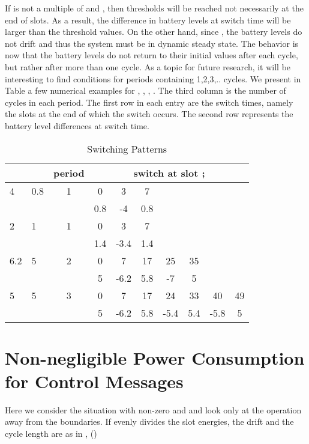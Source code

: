 \documentclass[12 pt]{article}
\newcommand{\debug}[1]{\mbox{\tt #1}}
\renewcommand{\debug}[1]{}              \newcommand{\cmd}[1]{}
\newcommand{\msec}[2]{\renewcommand{\sname}{}\section[#1
	\debug{\fbox {#2}}]{#1 \cmd{msec} \dlabelx{#2}}\markboth{\today}{Sec. \thesection}}
\begin{document}
If  is not a multiple of   and , then thresholds will be reached not necessarily at the end of slots.  As a result, the difference in battery levels at switch time will be larger than the threshold values.  On the other hand, since , the battery levels do not drift and thus the system must be in dynamic steady state.  The behavior is now that the battery levels do not return to their initial values after each cycle, but rather after more than one cycle.  As a topic for future research, it will be interesting to find conditions for periods containing 1,2,3,.. cycles.  We present in Table  a few numerical examples for , , , .  The third column is the number of cycles in each period.  The first row in each entry are the switch times, namely the slots at the end of which the switch occurs. The second row represents the battery level differences at switch time.


\begin{table}[hbtp]
\begin{center}
\begin{tabular}{|l|l|c|c|c|c|c|c|c|c|}
  \hline
  & & period & \multicolumn{7}{c|}{switch at slot ;  }\\ \hline
   4  &0.8 & 1 & 0   & 3    & 7  & & & &\\
      &    &   & 0.8 & -4 & 0.8  & &  & &\\ \hline
  2   & 1  & 1 & 0   & 3    & 7  & & & &\\
      &    &   & 1.4 & -3.4 & 1.4  & &  & &\\ \hline
  6.2 & 5  & 2 &  0  &  7   & 17  & 25  & 35 & & \\
      &    &   &  5  & -6.2 & 5.8 & -7 & 5 & &  \\ \hline
  5   & 5  & 3 &  0  & 7    & 17  & 24 & 33 &40 &49 \\
      &    &   &  5  & -6.2 & 5.8 & -5.4 & 5.4 & -5.8& 5\\
  \hline
\end{tabular}
\caption{Switching Patterns \debug{\fbox{Table-Patterns}}\label{Table-Patterns}}
\end{center}
\end{table}

\msec{Non-negligible Power Consumption for Control Messages}{nonnegligible}

Here we consider the situation with non-zero  and  and look only at the operation away from the boundaries.  If  evenly divides the slot energies, the drift  and the cycle length are as in , ()
\end{document}
